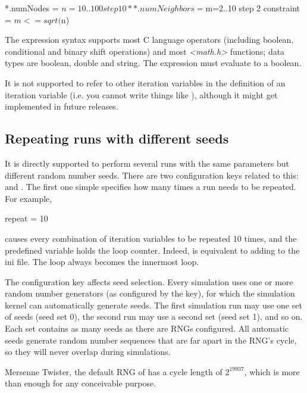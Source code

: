 \begin{inifile}
*.numNodes = ${n=10..100 step 10}
**.numNeighbors = ${m=2..10 step 2}
constraint = $m <= sqrt($n)
\end{inifile}

The expression syntax supports most C language operators (including
boolean, conditional and binary shift operations) and most
\textit{<math.h>} functions; data types are boolean,
double and string. The expression must evaluate to a boolean.

\begin{note}
    It is not supported to refer to other iteration variables
    in the definition of an iteration variable (i.e. you cannot write
    things like ), although it might get implemented in
    future {\opp} releases.
\end{note}

\subsection{Repeating runs with different seeds}

It is directly supported to perform several runs with the same
parameters but different random number seeds. There are two
configuration keys related to this:  and . The first
one simple specifies how many times a run needs to be repeated. For
example,

\begin{inifile}
repeat = 10
\end{inifile}

causes every combination of iteration variables to be repeated 10 times,
and the  predefined variable holds the loop counter.
Indeed,  is equivalent to adding 
to the ini file. The  loop always becomes the innermost loop.

The  configuration key affects seed selection. Every
simulation uses one or more random number generators (as configured by
the  key), for which the simulation kernel can automatically
generate seeds. The first simulation run may use one set of seeds (seed
set 0), the second run may use a second set (seed set 1), and so on.
Each set contains as many seeds as there are RNGs configured. All
automatic seeds generate random number sequences that are far apart in
the RNG's cycle, so they will never overlap during
simulations.

\begin{note}
Mersenne Twister, the default RNG of {\opp} has a cycle length of
$2^{19937}$, which is more than enough for any conceivable purpose.
\end{note}

